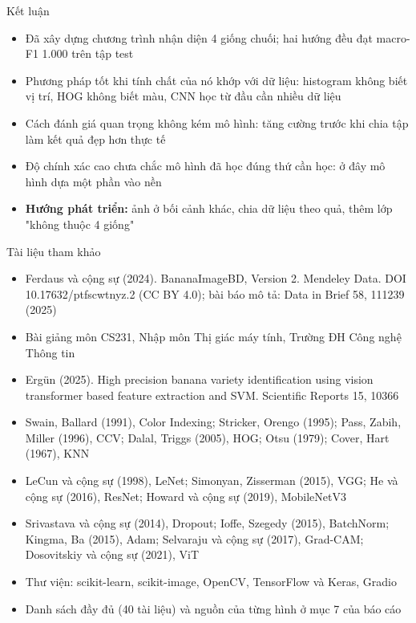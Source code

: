 \documentclass[aspectratio=169,10pt]{beamer}
\begin{document}
\begin{frame}{Kết luận}
\begin{itemize}
\item Đã xây dựng chương trình nhận diện 4 giống chuối; hai hướng đều đạt macro-F1 1.000 trên tập test
\item Phương pháp tốt khi tính chất của nó khớp với dữ liệu: histogram không biết vị trí, HOG không biết màu, CNN học từ đầu cần nhiều dữ liệu
\item Cách đánh giá quan trọng không kém mô hình: tăng cường trước khi chia tập làm kết quả đẹp hơn thực tế
\item Độ chính xác cao chưa chắc mô hình đã học đúng thứ cần học: ở đây mô hình dựa một phần vào nền
\item \textbf{Hướng phát triển:} ảnh ở bối cảnh khác, chia dữ liệu theo quả, thêm lớp "không thuộc 4 giống"
\end{itemize}
\end{frame}

\begin{frame}{Tài liệu tham khảo}
\begin{itemize}\small
\item [1] Ferdaus và cộng sự (2024). BananaImageBD, Version 2. Mendeley Data. DOI 10.17632/ptfscwtnyz.2 (CC BY 4.0); bài báo mô tả: Data in Brief 58, 111239 (2025)
\item [2] Bài giảng môn CS231, Nhập môn Thị giác máy tính, Trường ĐH Công nghệ Thông tin
\item [3] Ergün (2025). High precision banana variety identification using vision transformer based feature extraction and SVM. Scientific Reports 15, 10366
\item [4] Swain, Ballard (1991), Color Indexing; Stricker, Orengo (1995); Pass, Zabih, Miller (1996), CCV; Dalal, Triggs (2005), HOG; Otsu (1979); Cover, Hart (1967), KNN
\item [5] LeCun và cộng sự (1998), LeNet; Simonyan, Zisserman (2015), VGG; He và cộng sự (2016), ResNet; Howard và cộng sự (2019), MobileNetV3
\item [6] Srivastava và cộng sự (2014), Dropout; Ioffe, Szegedy (2015), BatchNorm; Kingma, Ba (2015), Adam; Selvaraju và cộng sự (2017), Grad-CAM; Dosovitskiy và cộng sự (2021), ViT
\item [7] Thư viện: scikit-learn, scikit-image, OpenCV, TensorFlow và Keras, Gradio
\item Danh sách đầy đủ (40 tài liệu) và nguồn của từng hình ở mục 7 của báo cáo
\end{itemize}
\end{frame}
\end{document}
